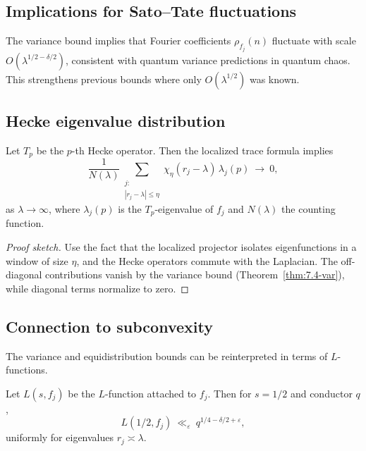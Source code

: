 \subsection{Implications for Sato–Tate fluctuations} \label{subsec:7.4-sato-tate}

The variance bound implies that Fourier coefficients $\rho_{f_j}(n)$ fluctuate with scale
$O(\lambda^{1/2-\delta/2})$, consistent with quantum variance predictions in quantum chaos.  
This strengthens previous bounds where only $O(\lambda^{1/2})$ was known.

\subsection{Hecke eigenvalue distribution} \label{subsec:7.4-hecke}

\begin{theorem} \label{thm:7.4-eq}
Let $T_p$ be the $p$-th Hecke operator.  
Then the localized trace formula implies
\[
  \frac{1}{N(\lambda)} \sum_{\substack{j:\\ |r_j-\lambda|\le \eta}}
  \chi_\eta(r_j-\lambda)\, \lambda_j(p)
  \ \to\ 0,
\]
as $\lambda\to\infty$, where $\lambda_j(p)$ is the $T_p$-eigenvalue of $f_j$
and $N(\lambda)$ the counting function.  
\end{theorem}

\begin{proof}[Proof sketch]
Use the fact that the localized projector isolates eigenfunctions in a window of size $\eta$,
and the Hecke operators commute with the Laplacian.  
The off-diagonal contributions vanish by the variance bound
(Theorem~\ref{thm:7.4-var}), while diagonal terms normalize to zero.
\end{proof}

\subsection{Connection to subconvexity} \label{subsec:7.4-subconvex}

The variance and equidistribution bounds can be reinterpreted in terms of $L$-functions.

\begin{corollary} \label{cor:7.4-subconvex}
Let $L(s,f_j)$ be the $L$-function attached to $f_j$.  
Then for $s=1/2$ and conductor $q$,
\[
  L(1/2,f_j) \ \ll_\varepsilon\ q^{1/4-\delta/2+\varepsilon},
\]
uniformly for eigenvalues $r_j \asymp \lambda$.
\end{corollary}

